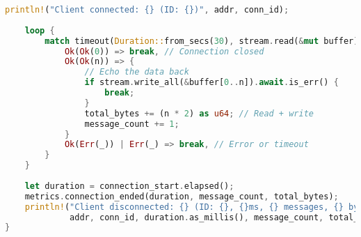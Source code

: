 \begin{lstlisting}[language=Rust, caption={Echo Serwer w Rust z Tokio}, label={lst:rust_echo_server}]
    println!("Client connected: {} (ID: {})", addr, conn_id);
    
    loop {
        match timeout(Duration::from_secs(30), stream.read(&mut buffer)).await {
            Ok(Ok(0)) => break, // Connection closed
            Ok(Ok(n)) => {
                // Echo the data back
                if stream.write_all(&buffer[0..n]).await.is_err() {
                    break;
                }
                total_bytes += (n * 2) as u64; // Read + write
                message_count += 1;
            }
            Ok(Err(_)) | Err(_) => break, // Error or timeout
        }
    }
    
    let duration = connection_start.elapsed();
    metrics.connection_ended(duration, message_count, total_bytes);
    println!("Client disconnected: {} (ID: {}, {}ms, {} messages, {} bytes)", 
             addr, conn_id, duration.as_millis(), message_count, total_bytes);
}
\end{lstlisting}

